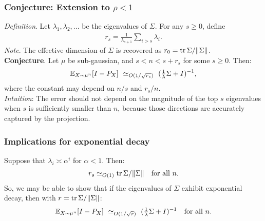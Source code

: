 \documentclass[10pt]{beamer}
\begin{document}
\begin{frame}
  \frametitle{Conjecture: Extension to $\rho<1$}
 \emph{Definition}. Let $\lambda_1,\lambda_2,...$ be the eigenvalues
 of $\Sigma$.
 For any $s\geq 0$, define
 \begin{align*}
   r_s = \frac1{\lambda_{s+1}}\sum_{i>s}\lambda_i.
 \end{align*}
\emph{Note}. The effective dimension of $\Sigma$ is recovered as $r_0=\mathrm{tr}\,\Sigma/\|\Sigma\|$.
\\[10mm]

  \textbf{Conjecture}.
Let $\mu$ be sub-gaussian, and $s<n<s+r_s$ for some $s\geq 0$. Then:
\begin{align*}
\mathbb E_{X\sim\mu^n}[I-P_X]\ \simeq_{O(1/\sqrt{r_s})}\ (\tfrac1\lambda\Sigma+ I)^{-1},
\end{align*}
where the constant may depend on $n/s$ and $r_s/n$.\\[5mm]


\emph{Intuition}: The error should not depend on the magnitude of the
top $s$ eigenvalues when $s$ is sufficiently smaller than $n$, because
those directions are accurately captured by the projection.

\end{frame}

\begin{frame}
  \frametitle{Implications for exponential decay}
  Suppose that $\lambda_i\asymp \alpha^i$ for $\alpha<1$. Then:
  \begin{align*}
    r_s \simeq_{O(1)}  \mathrm{tr}\,\Sigma / \|\Sigma\|\quad\text{for all $n$.}
  \end{align*}
  So, we may be able to show that if the eigenvalues of $\Sigma$
  exhibit exponential decay, then with $r=\mathrm{tr}\,\Sigma / \|\Sigma\|$:
  \begin{align*}
    \mathbb E_{X\sim\mu^n}[I-P_X]\ \simeq_{O(1/\sqrt{r})}\
    (\tfrac1\lambda\Sigma+ I)^{-1}\quad\text{for all $n$.}
    \end{align*}
\end{frame}
\end{document}
